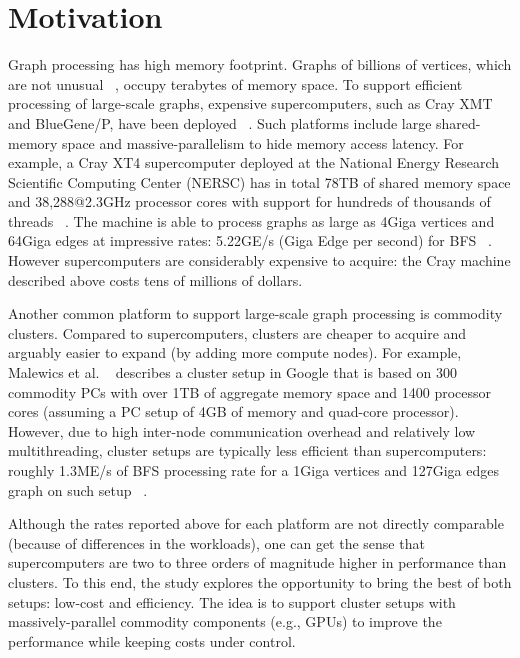 \section{Motivation}
\label{sec:motivation}
Graph processing has high memory footprint. Graphs of billions of vertices, which are not unusual ~\cite{graph500}, occupy terabytes of memory space. To support efficient processing of large-scale graphs, expensive supercomputers, such as Cray XMT and BlueGene/P, have been deployed ~\cite{mizell2009early, yoo2005scalable}. Such platforms include large shared-memory space and massive-parallelism to hide memory access latency. For example, a Cray XT4 supercomputer deployed at the National Energy Research Scientific Computing Center (NERSC) has in total 78TB of shared memory space and 38,288@2.3GHz processor cores with support for hundreds of thousands of threads ~\cite{franklin2011cray}. The machine is able to process graphs as large as 4Giga vertices and 64Giga edges at impressive rates: 5.22GE/s (Giga Edge per second) for BFS ~\cite{graph500}. However supercomputers are considerably expensive to acquire: the Cray machine described above costs tens of millions of dollars.

Another common platform to support large-scale graph processing is commodity clusters. Compared to supercomputers, clusters are cheaper to acquire and arguably easier to expand (by adding more compute nodes). For example, Malewics et al. ~\cite{Malewicz2009} describes a cluster setup in Google that is based on 300 commodity PCs with over 1TB of aggregate memory space and 1400 processor cores (assuming a PC setup of 4GB of memory and quad-core processor). However, due to high inter-node communication overhead and relatively low multithreading, cluster setups are typically less efficient than supercomputers: roughly 1.3ME/s of BFS processing rate for a 1Giga vertices and 127Giga edges graph on such setup ~\cite{Malewicz2009}.

Although the rates reported above for each platform are not directly comparable (because of differences in the workloads), one can get the sense that supercomputers are two to three orders of magnitude higher in performance than clusters. To this end, the study explores the opportunity to bring the best of both setups: low-cost and efficiency. The idea is to support cluster setups with massively-parallel commodity components (e.g., GPUs) to improve the performance while keeping costs under control. 
